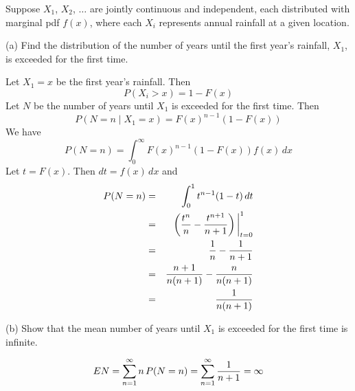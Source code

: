 \documentclass[12pt]{article}
\begin{document}
Suppose $X_1$, $X_2$, $\ldots$ are jointly continuous and independent,
each distributed with marginal pdf $f(x)$, where each $X_i$
represents annual rainfall at a given location.

\bigskip
\noindent
(a) Find the distribution of the number of years until the first
year's rainfall, $X_1$, is exceeded for the first time.

\bigskip
\noindent
Let $X_1=x$ be the first year's rainfall. Then
$$P(X_i>x)=1-F(x)$$
Let $N$ be the number of years until $X_1$ is exceeded for the first
time. Then
$$P(N=n\mid X_1=x)=F(x)^{n-1}(1-F(x))$$
We have
$$P(N=n)=\int_0^\infty F(x)^{n-1}(1-F(x))f(x)\,dx$$
Let $t=F(x)$. Then $dt=f(x)\,dx$ and
\begin{eqnarray*}
P(N=n)&=&\int_0^1 t^{n-1}(1-t)\,dt\\
&=&\left({t^n\over n}-{t^{n+1}\over n+1}\right)\bigg|_{t=0}^1\\
&=&{1\over n}-{1\over n+1}\\
&=&{n+1\over n(n+1)}-{n\over n(n+1)}\\
&=&{1\over n(n+1)}
\end{eqnarray*}

\bigskip
\noindent
(b) Show that the mean number of years until $X_1$ is exceeded for
the first time is infinite.

$$EN=\sum_{n=1}^\infty n\,P(N=n)
=\sum_{n=1}^\infty{1\over n+1}=\infty$$
\end{document}
